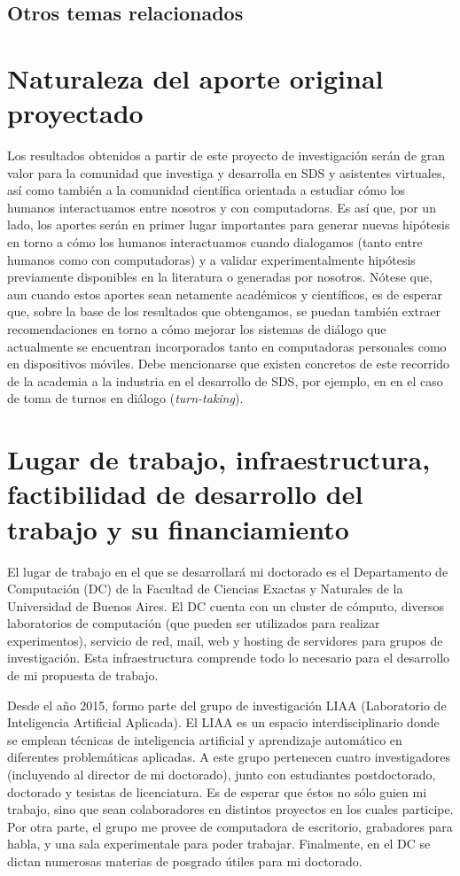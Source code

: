 \documentclass{article}
\begin{document}
\subsection{Otros temas relacionados}


\section{Naturaleza del aporte original proyectado}

Los resultados obtenidos a partir de este proyecto de investigación serán de gran valor para la comunidad que investiga y desarrolla en SDS y asistentes virtuales, así como también a la comunidad científica orientada a estudiar cómo los humanos interactuamos entre nosotros y con computadoras. Es así que, por un lado, los aportes serán en primer lugar importantes para generar nuevas hipótesis en torno a cómo los humanos interactuamos cuando dialogamos (tanto entre humanos como con computadoras) y a validar experimentalmente hipótesis previamente disponibles en la literatura o generadas por nosotros. Nótese que, aun cuando estos aportes sean netamente académicos y científicos, es de esperar que, sobre la base de los resultados que obtengamos, se puedan también extraer recomendaciones en torno a cómo mejorar los sistemas de diálogo que actualmente se encuentran incorporados tanto en computadoras personales como en dispositivos móviles. Debe mencionarse que existen concretos de este recorrido de la academia a la industria en el desarrollo de SDS, por ejemplo, en en el caso de toma de turnos en diálogo (\textit{turn-taking}).


\section{Lugar de trabajo, infraestructura, factibilidad de desarrollo del trabajo y su financiamiento}

El lugar de trabajo en el que se desarrollará mi doctorado es el Departamento de Computación (DC) de la Facultad de Ciencias Exactas y Naturales de la Universidad de Buenos Aires. El DC cuenta con un cluster de cómputo, diversos laboratorios de computación (que pueden ser utilizados para realizar experimentos), servicio de red, mail, web y hosting de servidores para grupos de investigación. Esta infraestructura comprende todo lo necesario para el desarrollo de mi propuesta de trabajo.

Desde el año 2015, formo parte del grupo de investigación LIAA (Laboratorio de Inteligencia Artificial Aplicada). El LIAA es un espacio interdisciplinario donde se emplean técnicas de inteligencia artificial y aprendizaje automático en diferentes problemáticas aplicadas. A este grupo pertenecen cuatro investigadores (incluyendo al director de mi doctorado), junto con estudiantes postdoctorado, doctorado y tesistas de licenciatura. Es de esperar que éstos no sólo guien mi trabajo, sino que sean colaboradores en distintos proyectos en los cuales participe. Por otra parte, el grupo me provee de computadora de escritorio, grabadores para habla, y una sala experimentale para poder trabajar. Finalmente, en  el DC se dictan numerosas materias de posgrado útiles para mi doctorado.
\end{document}
